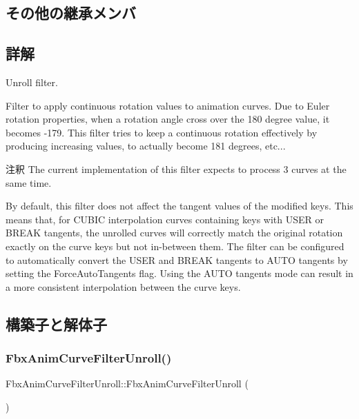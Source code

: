 \subsection*{その他の継承メンバ}


\subsection{詳解}
Unroll filter.

Filter to apply continuous rotation values to animation curves. Due to Euler rotation properties, when a rotation angle cross over the 180 degree value, it becomes -\/179. This filter tries to keep a continuous rotation effectively by producing increasing values, to actually become 181 degrees, etc... \begin{DoxyRemark}{注釈}
The current implementation of this filter expects to process 3 curves at the same time. 

By default, this filter does not affect the tangent values of the modified keys. This means that, for C\+U\+B\+IC interpolation curves containing keys with U\+S\+ER or B\+R\+E\+AK tangents, the unrolled curves will correctly match the original rotation exactly on the curve keys but not in-\/between them. The filter can be configured to automatically convert the U\+S\+ER and B\+R\+E\+AK tangents to A\+U\+TO tangents by setting the Force\+Auto\+Tangents flag. Using the A\+U\+TO tangents mode can result in a more consistent interpolation between the curve keys. 
\end{DoxyRemark}


\subsection{構築子と解体子}
\mbox{\label{class_fbx_anim_curve_filter_unroll_a8500355d825ebd7d853bc2b9ab561e40}} 
\subsubsection{\texorpdfstring{Fbx\+Anim\+Curve\+Filter\+Unroll()}{FbxAnimCurveFilterUnroll()}}
{\footnotesize\ttfamily Fbx\+Anim\+Curve\+Filter\+Unroll\+::\+Fbx\+Anim\+Curve\+Filter\+Unroll (\begin{DoxyParamCaption}{ }\end{DoxyParamCaption})}



